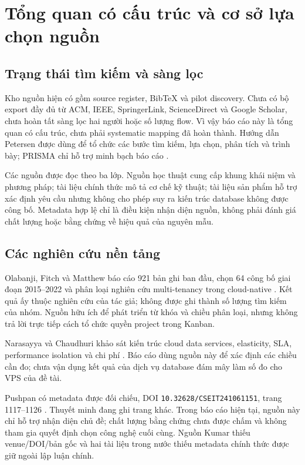 \section{Tổng quan có cấu trúc và cơ sở lựa chọn nguồn}\label{sec:related}
\subsection{Trạng thái tìm kiếm và sàng lọc}
Kho nguồn hiện có gồm source register, BibTeX và pilot discovery. Chưa có bộ export đầy đủ từ ACM, IEEE, SpringerLink, ScienceDirect và Google Scholar, chưa hoàn tất sàng lọc hai người hoặc số lượng flow. Vì vậy báo cáo này là tổng quan có cấu trúc, chưa phải systematic mapping đã hoàn thành. Hướng dẫn Petersen được dùng để tổ chức các bước tìm kiếm, lựa chọn, phân tích và trình bày; PRISMA chỉ hỗ trợ minh bạch báo cáo \citep{petersen2015mapping,page2021prisma}.

Các nguồn được đọc theo ba lớp. Nguồn học thuật cung cấp khung khái niệm và phương pháp; tài liệu chính thức mô tả cơ chế kỹ thuật; tài liệu sản phẩm hỗ trợ xác định yêu cầu nhưng không cho phép suy ra kiến trúc database không được công bố. Metadata hợp lệ chỉ là điều kiện nhận diện nguồn, không phải đánh giá chất lượng hoặc bằng chứng về hiệu quả của nguyên mẫu.

\subsection{Các nghiên cứu nền tảng}
Olabanji, Fitch và Matthew báo cáo 921 bản ghi ban đầu, chọn 64 công bố giai đoạn 2015--2022 và phân loại nghiên cứu multi-tenancy trong cloud-native \citep{olabanji2023multitenancy}. Kết quả ấy thuộc nghiên cứu của tác giả; không được ghi thành số lượng tìm kiếm của nhóm. Nguồn hữu ích để phát triển từ khóa và chiều phân loại, nhưng không trả lời trực tiếp cách tổ chức quyền project trong Kanban.

Narasayya và Chaudhuri khảo sát kiến trúc cloud data services, elasticity, SLA, performance isolation và chi phí \citep{narasayya2021cloud}. Báo cáo dùng nguồn này để xác định các chiều cần đo; chưa vận dụng kết quả của dịch vụ database đám mây làm số đo cho VPS của đề tài.

Pushpan có metadata được đối chiếu, DOI \nolinkurl{10.32628/CSEIT241061151}, trang 1117--1126 \citep{pushpan2024multitenant}. Thuyết minh đang ghi trang khác. Trong báo cáo hiện tại, nguồn này chỉ hỗ trợ nhận diện chủ đề; chất lượng bằng chứng chưa được chấm và không tham gia quyết định chọn công nghệ cuối cùng. Nguồn Kumar thiếu venue\slash DOI\slash bản gốc và hai tài liệu trong nước thiếu metadata chính thức được giữ ngoài lập luận chính.

